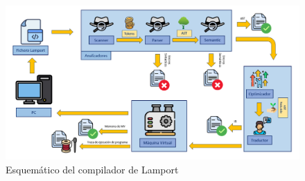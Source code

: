 \begin{figure}[h]
    \includegraphics[width=\linewidth]{images/lmp/lmp_resume.png}
    \caption{Esquemático del compilador de Lamport}
    \label{fig:lmpresume}
\end{figure}




